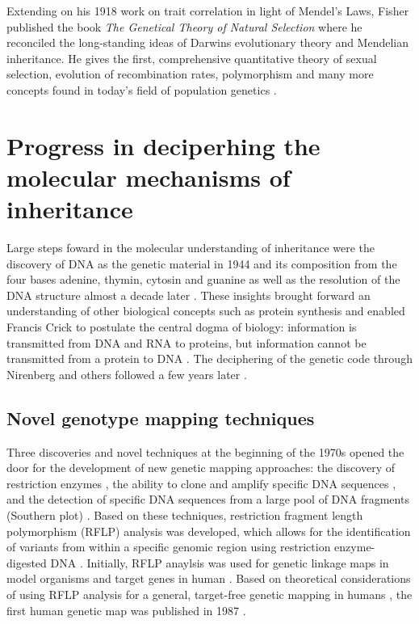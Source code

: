 Extending on his 1918 work on trait correlation in light of Mendel's Laws, Fisher published the book \textit{The Genetical Theory of Natural Selection} where he reconciled the long-standing ideas of Darwins evolutionary theory and Mendelian inheritance. He gives the first, comprehensive quantitative theory of sexual selection, evolution of recombination rates, polymorphism and many more concepts found in today's field of population genetics \citep{Fisher1930}. 

\section{Progress in deciperhing the molecular mechanisms of inheritance}
Large steps foward in the molecular understanding of inheritance were the discovery of DNA as the genetic material in 1944 \citep{Avery1944} and its composition from the four bases adenine, thymin, cytosin and guanine \citep{Vischer1948,Chargaff1949,Chargaff1952} as well as the resolution of the DNA structure almost a decade later \citep{Watson1953}. These insights brought forward an understanding of other biological concepts such as protein synthesis and enabled Francis Crick to postulate the central dogma of biology:  information is transmitted from DNA and RNA to proteins, but information cannot be transmitted from a protein to DNA \citep{Crick1958}. The deciphering of the genetic code through Nirenberg and others followed a few years later \citep{Nirenberg1961,Crick1961,Matthaei1962}.  

\subsection{Novel genotype mapping techniques}
\label{subsection:mapping-techniques}
Three discoveries and novel techniques at the beginning of the 1970s opened the door for the development of new genetic mapping approaches: the discovery of restriction enzymes \citep{Smith1970,Morrow1972}, the ability to clone and amplify specific DNA sequences \citep{Jackson1972,Cohen1973}, and the detection of specific DNA sequences from a large pool of DNA fragments (Southern plot) \citep{Southern1975}. Based on these techniques, restriction fragment length polymorphism (RFLP) analysis was developed, which allows for the identification of variants from within a specific genomic region using restriction enzyme-digested DNA \citep{Grodzicker1974,Botstein1980}. Initially, RFLP anaylsis was used for genetic linkage maps in model organisms \citep{Goodman1977,Cameron1979} and target genes in human  \citep{Kan1978,Jeffreys1979,Tuan1979}.  Based on theoretical considerations of using RFLP analysis for a general, target-free genetic mapping in humans \citep{Botstein1980}, the first human genetic map was published in 1987 \citep{Donis-Keller1987}. 

